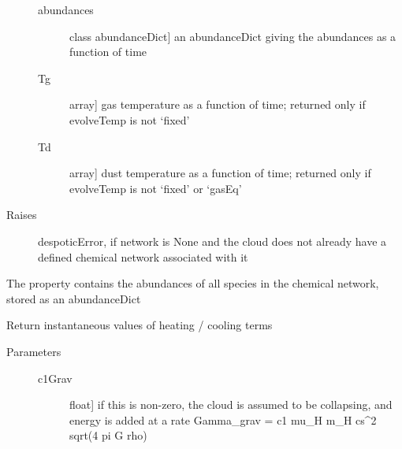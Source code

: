 \documentclass[letterpaper,10pt,english]{sphinxmanual}
\begin{document}
\begin{fulllineitems}
\begin{fulllineitems}
\begin{description}
\begin{description}
\item[{abundances}] \leavevmode{[}class abundanceDict{]}
an abundanceDict giving the abundances as a function of time

\item[{Tg}] \leavevmode{[}array{]}
gas temperature as a function of time; returned only if
evolveTemp is not `fixed'

\item[{Td}] \leavevmode{[}array{]}
dust temperature as a function of time; returned only if
evolveTemp is not `fixed' or `gasEq'

\end{description}

\item[{Raises}] \leavevmode
despoticError, if network is None and the cloud does not already
have a defined chemical network associated with it

\end{description}

\end{fulllineitems}


\begin{fulllineitems}
\label{fulldoc:despotic.cloud.chemabundances}
The property contains the abundances of all species in the
chemical network, stored as an abundanceDict

\end{fulllineitems}


\begin{fulllineitems}
\label{fulldoc:despotic.cloud.dEdt}
Return instantaneous values of heating / cooling terms
\begin{description}
\item[{Parameters}] \leavevmode\begin{description}
\item[{c1Grav}] \leavevmode{[}float{]}
if this is non-zero, the cloud is assumed to be
collapsing, and energy is added at a rate
Gamma\_grav = c1 mu\_H m\_H cs\textasciicircum{}2 sqrt(4 pi G rho)


\end{description}
\end{description}
\end{fulllineitems}
\end{fulllineitems}
\end{document}
